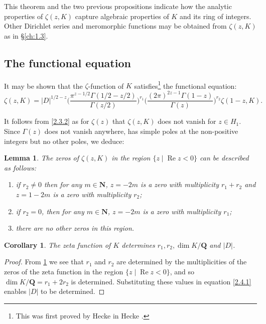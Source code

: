 \documentclass[10pt]{article}
\newtheorem{lemm}[theo]{Lemma}
\newtheorem{coro}[theo]{Corollary}
\theoremstyle{definition}
\def\NN{\mathbf{N}}
\def\QQ{\mathbf{Q}}
\DeclareMathOperator{\re}{Re}
\def\fnonni{This was first proved by Hecke in Hecke \cite{bib:94}.}
\begin{document}
This theorem and the two previous propositions indicate how the analytic properties of $\zeta(z,K)$ capture algebraic properties of $K$ and its ring of integers.
Other Dirichlet series and meromorphic functions may be obtained from $\zeta(z,K)$ as in \S\ref{ch:1.3}.


\subsection{The functional equation}
\label{ch:2.4}

It may be shown that the $\zeta$-function of $K$ satisfies\footnote{\fnonni} the functional equation:
\begin{equation}
\label{2.4.1}
\zeta(z,K)
= |D|^{1/2 - z}
\biggl(
\frac{\pi^{z-1/2} \Gamma(1/2 - z/2)}{\Gamma(z/2)}
\biggr)^{r_1}
\biggl(
\frac{(2\pi)^{2z-1} \Gamma(1-z)}{\Gamma(z)}
\biggr)^{r_2}
\zeta(1-z, K).
\end{equation}

It follows from \ref{2.3.2} as for $\zeta(z)$ that $\zeta(z,K)$ does not vanish for $z \in H_1$.
Since $\Gamma(z)$ does not vanish anywhere, has simple poles at the non-positive integers but no other poles, we deduce:

\begin{lemm}
\label{2.4.2}
The zeros of $\zeta(z,K)$ in the region $\{z \mid \re z < 0 \}$ can be described as follows:
\begin{enumerate}
\item
if $r_2\not=0$ then for any $m \in \NN$, $z = -2m$ is a zero with multiplicity $r_1 + r_2$ and $z = 1-2m$ is a zero with multiplicity $r_2$;

\item
if $r_2 = 0$, then for any $m \in \NN$, $z = -2m$ is a zero with multiplicity $r_1$;

\item
there are no other zeros in this region.
\end{enumerate}
\end{lemm}



\begin{coro}
\label{2.4.3}
The zeta function of $K$ determines $r_1, r_2, \dim K/\QQ$ and $|D|$.
\end{coro}

\begin{proof}
From \ref{2.4.2} we see that $r_1$ and $r_2$ are determined by the multiplicities of the zeros of the zeta function in the region $\{ z \mid \re z < 0 \}$, and so $\dim K/\QQ = r_1 + 2r_2$ is determined.
Substituting these values in equation \eqref{2.4.1} enables $|D|$ to be determined.
\end{proof}
\end{document}
